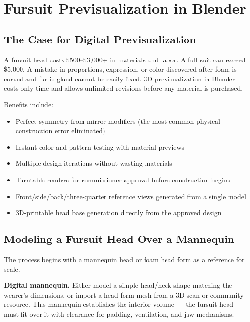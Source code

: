 
\section{Fursuit Previsualization in Blender}
\label{sec:furry-fursuit}

\subsection{The Case for Digital Previsualization}

A fursuit head costs \$500--\$3,000+ in materials and labor. A full suit can exceed \$5,000. A mistake in proportions, expression, or color discovered after foam is carved and fur is glued cannot be easily fixed. 3D previsualization in Blender costs only time and allows unlimited revisions before any material is purchased.

Benefits include:

\begin{itemize}[leftmargin=2em]
  \item Perfect symmetry from mirror modifiers (the most common physical construction error eliminated)
  \item Instant color and pattern testing with material previews
  \item Multiple design iterations without wasting materials
  \item Turntable renders for commissioner approval before construction begins
  \item Front/side/back/three-quarter reference views generated from a single model
  \item 3D-printable head base generation directly from the approved design
\end{itemize}


\subsection{Modeling a Fursuit Head Over a Mannequin}

The process begins with a mannequin head or foam head form as a reference for scale.

\textbf{Digital mannequin.} Either model a simple head/neck shape matching the wearer's dimensions, or import a head form mesh from a 3D scan or community resource. This mannequin establishes the interior volume --- the fursuit head must fit over it with clearance for padding, ventilation, and jaw mechanisms.

